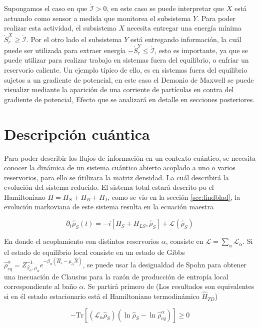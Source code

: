 Supongamos el caso en que $\dot{\mathcal{I}}> 0$, en este caso se puede interpretar que $X$ está actuando como sensor a medida que monitorea el subsistema $Y$. Para poder realizar esta actividad, el subsistema $X$ necesita entregar una energía mínima $\dot{S}_{r}^{X} \geq \dot{\mathcal {I}}$. Por el otro lado el subsistema $Y$ está entregando información, la cuál puede ser utilizada para extraer energía $-\dot{S}_{r}^{Y} \leq \dot{\mathcal{I}}$, esto es importante, ya que se puede utilizar para realizar trabajo en sistemas fuera del equilibrio, o enfriar un reservorio caliente. Un ejemplo típico de ello, es en sistemas fuera del equilibrio sujetos a un gradiente de potencial, en este caso el Demonio de Maxwell se puede visualizr mediante la aparición de una corriente de partículas en contra del gradiente de potencial, Efecto que se analizará en detalle en secciones posteriores.

\section{Descripción cuántica}
Para poder describir los flujos de información en un contexto cuántico, se necesita conocer la dinámica de un sistema cuántico abierto acoplado a uno o varios reservorios, para ello se útilizara la matriz densidad. La cuál describirá la evolución del sistema reducido. El sistema total estará descrito po el Hamiltoniano $H = H_{S}+H_{B}+ H_{I}$, como se vio en la sección \ref{sec:lindblad}, la evolución markoviana de este sistema resulta en la ecuación maestra

\begin{equation*}
    \partial_{t}\hat{\rho}_{S}(t) = - i[H_{S} + H_{LS},\hat{\rho}_{S}] + \mathcal{L}(\hat{\rho}_{S})
\end{equation*}

En donde el acoplamiento con distintos reservorios $\alpha$, consiste en $\mathcal{L} = \sum_{\alpha}\mathcal{L}_{\alpha}$. Si el estado de equilibrio local consiste en un estado de Gibbs $\hat{\rho}_{eq}^{\alpha} = Z_{\beta_{\alpha},\mu_{\alpha}}^{-1}e^{-\beta_{\alpha}(\hat{H}_{s} - \mu_{\alpha}\hat{N})}$, se puede usar la desigualdad de Spohn \cite{spohn1978entropy} para  obtener una inecuación de Clausius para la razón de producción de entropía local correspondiente al baño $\alpha$. Se partirá primero de (Los resultados son equivalentes si en él estado estacionario está el Hamiltoniano termodinámico $\hat{H}_{TD}$)

\begin{equation}
    - \text{Tr}[ (\mathcal{L}_{\alpha} \hat{\rho}_{S})(\ln \hat{\rho}_{S} - \ln \hat{\rho}^{\alpha}_{eq} )  ] \geq 0
\label{spohninfo}
\end{equation}

